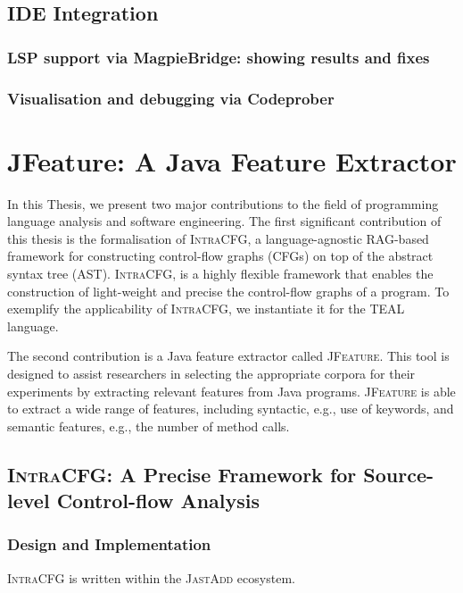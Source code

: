 \subsection{IDE Integration}
\subsubsection{LSP support via MagpieBridge: showing results and fixes}

\subsubsection{Visualisation and debugging via Codeprober}



\section{JFeature: A Java Feature Extractor}






\label{sec:contribution}
In this Thesis, we present two major contributions to the field of programming 
language analysis and software engineering. 
The first significant contribution of this thesis is the formalisation of \textsc{IntraCFG},
a language-agnostic RAG-based framework for constructing control-flow graphs (CFGs) 
on top of the abstract syntax tree (AST). \textsc{IntraCFG}, is a highly flexible
framework that enables the construction of light-weight and precise the control-flow graphs
of a program. To exemplify the applicability of \textsc{IntraCFG}, we instantiate it for the TEAL language.

The second contribution is a Java feature extractor called \textsc{JFeature}.
This tool is designed to assist researchers in selecting the appropriate corpora
for their experiments by extracting relevant features from Java programs. 
\textsc{JFeature} is able to extract a wide range of features, 
including syntactic, e.g., use of keywords, and semantic features, e.g.,
the number of method calls.


\subsection{\textsc{IntraCFG}: A Precise Framework for Source-level Control-flow Analysis}

\subsubsection*{Design and Implementation}
\textsc{IntraCFG} is written within the \textsc{JastAdd} ecosystem.

